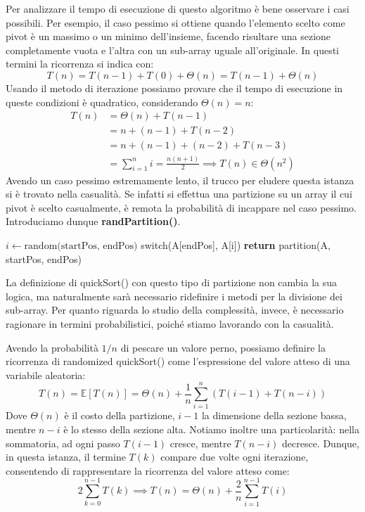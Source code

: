 \noindent Per analizzare il tempo di esecuzione di questo algoritmo è bene osservare i casi possibili. Per esempio, il caso pessimo si ottiene quando l'elemento scelto come pivot è un massimo o un minimo dell'insieme, facendo risultare una sezione completamente vuota e l'altra con un sub-array uguale all'originale. In questi termini la ricorrenza si indica con: \[T(n) = T(n-1) + T(0) + \Theta(n) = T(n-1) + \Theta(n)\]
\noindent Usando il metodo di iterazione possiamo provare che il tempo di esecuzione in queste condizioni è quadratico, considerando $\Theta(n) = n$: \begin{equation}
	\begin{split}
		T(n) &= \Theta(n) + T(n-1)\\
			&= n + (n-1) + T(n-2)\\
			&= n + (n-1) + (n-2) + T(n-3)\\
			&= \sum_{i=1}^n i = \frac{n(n+1)}{2} \implies T(n) \in \Theta(n^2)
	\end{split}
\end{equation}
\noindent Avendo un caso pessimo estremamente lento, il trucco per eludere questa istanza si è trovato nella casualità. Se infatti si effettua una partizione su un array il cui pivot è scelto casualmente, è remota la probabilità di incappare nel caso pessimo. Introduciamo dunque \textbf{randPartition()}.
\begin{algorithm}[H]
	\caption{randPartition(A, startPos, endPos)}
	\begin{algorithmic}[i]
		\State $i\gets \text{random(startPos, endPos)}$ 
		\State switch(A[endPos], A[i])
		\State \textbf{return} partition(A, startPos, endPos)
	\end{algorithmic}
\end{algorithm}
\noindent La definizione di quickSort() con questo tipo di partizione non cambia la sua logica, ma naturalmente sarà necessario ridefinire i metodi per la divisione dei sub-array. Per quanto riguarda lo studio della complessità, invece, è necessario ragionare in termini probabilistici, poiché stiamo lavorando con la casualità.\par
Avendo la probabilità $1/n$ di pescare un valore perno, possiamo definire la ricorrenza di randomized quickSort() come l'espressione del valore atteso di una variabile aleatoria: \[T(n) = \mathbb{E}[T(n)] = \Theta(n) + \frac{1}{n}\sum_{i=1}^{n} (T(i-1) + T(n-i))\]
\noindent Dove $\Theta(n)$ è il costo della partizione, $i-1$ la dimensione della sezione bassa, mentre $n-i$ è lo stesso della sezione alta. Notiamo inoltre una particolarità: nella sommatoria, ad ogni passo $T(i-1)$ cresce, mentre $T(n-i)$ decresce. Dunque, in questa istanza, il termine $T(k)$ compare due volte ogni iterazione, consentendo di rappresentare la ricorrenza del valore atteso come: \[2\sum_{k=0}^{n-1} T(k) \implies T(n) = \Theta(n) + \frac{2}{n}\sum_{i=1}^{n-1}T(i)\]

